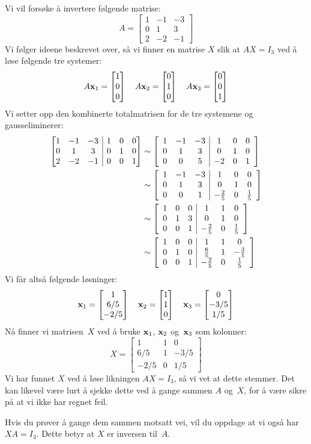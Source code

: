\begin{ex}
\label{ex:invers}
Vi vil forsøke å invertere følgende matrise:
\[
A =
\begin{bmatrix}
1 & -1 & -3 \\
0 &  1 &  3 \\
2 & -2 & -1
\end{bmatrix}
\]
Vi følger ideene beskrevet over, så vi finner en matrise $X$ slik at
$AX = I_3$ ved å løse følgende tre systemer:
\[
A \mathbf{x}_1 = \begin{bmatrix} 1 \\ 0 \\ 0 \end{bmatrix}
\quad
A \mathbf{x}_2 = \begin{bmatrix} 0 \\ 1 \\ 0 \end{bmatrix}
\quad
A \mathbf{x}_3 = \begin{bmatrix} 0 \\ 0 \\ 1 \end{bmatrix}
\]
Vi setter opp den kombinerte totalmatrisen for de tre systemene og
gausseliminerer:
\begin{align*}
\left[
\begin{array}{@{}ccc|ccc@{}}
1 & -1 & -3 & 1 & 0 & 0 \\
0 & 1 & 3 & 0 & 1 & 0 \\
2 & -2 & -1 & 0 & 0 & 1
\end{array}
\right]
&
\roweq
\left[
\begin{array}{ccc|ccc}
1 & -1 & -3 & 1 & 0 & 0 \\
0 & 1 & 3 & 0 & 1 & 0 \\
0 & 0 & 5 & -2 & 0 & 1
\end{array}
\right]
\\
&\roweq
\left[
\begin{array}{ccc|ccc}
1 & -1 & -3 & 1 & 0 & 0 \\
0 & 1 & 3 & 0 & 1 & 0 \\
0 & 0 & 1 & -\frac{2}{5} & 0 & \frac{1}{5}
\end{array}
\right]
\\
&\roweq
\left[
\begin{array}{ccc|ccc}
1 & 0 & 0 & 1 & 1 & 0 \\
0 & 1 & 3 & 0 & 1 & 0 \\
0 & 0 & 1 & -\frac{2}{5} & 0 & \frac{1}{5}
\end{array}
\right]
\\
&\roweq
\left[
\begin{array}{ccc|ccc}
1 & 0 & 0 & 1 & 1 & 0 \\
0 & 1 & 0 & \frac{6}{5} & 1 & -\frac{3}{5} \\
0 & 0 & 1 & -\frac{2}{5} & 0 & \frac{1}{5}
\end{array}
\right]
\end{align*}
Vi får altså følgende løsninger:
\[
\mathbf{x}_1 = \begin{bmatrix} 1 \\ 6/5 \\ -2/5 \end{bmatrix}
\quad
\mathbf{x}_2 = \begin{bmatrix} 1 \\ 1 \\ 0 \end{bmatrix}
\quad
\mathbf{x}_3 = \begin{bmatrix} 0 \\ -3/5 \\ 1/5 \end{bmatrix}
\]
Nå finner vi matrisen~$X$ ved å bruke $\mathbf{x}_1$, $\mathbf{x}_2$
og~$\mathbf{x}_3$ som kolonner:
\[
X =
\begin{bmatrix}
1 & 1 & 0 \\
6/5 & 1 & -3/5 \\
-2/5 & 0 & 1/5
\end{bmatrix}
\]
Vi har funnet $X$ ved å løse likningen $AX = I_3$, så vi vet at dette
stemmer.  Det kan likevel være lurt å sjekke dette ved å gange sammen
$A$ og~$X$, for å være sikre på at vi ikke har regnet feil.

Hvis du prøver å gange dem sammen motsatt vei, vil du oppdage at vi
også har $XA = I_3$.  Dette betyr at $X$ er inversen til~$A$.
\end{ex}


